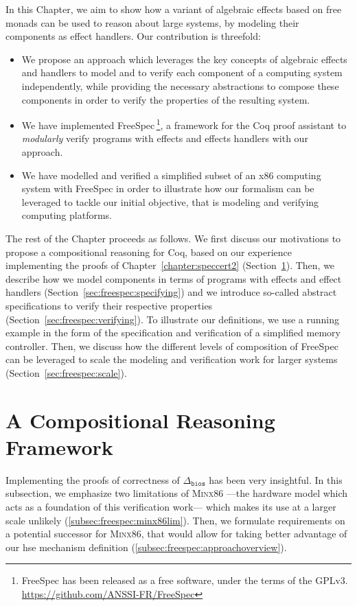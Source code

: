 In this Chapter, we aim to show how a variant of algebraic effects based on free
monads can be used to reason about large systems, by modeling their components
as effect handlers.
%
Our contribution is threefold:
\begin{itemize}
\item We propose an approach which leverages the key concepts of algebraic
  effects and handlers to model and to verify each component of a computing
  system independently, while providing the necessary abstractions to compose
  these components in order to verify the properties of the resulting system.
%
\item We have implemented FreeSpec\,\footnote{FreeSpec has been released as a
    free software, under the terms of the GPLv3.
    \url{https://github.com/ANSSI-FR/FreeSpec}}, a framework for the Coq proof
  assistant to \emph{modularly} verify programs with effects and effects
  handlers with our approach.
%
\item We have modelled and verified a simplified subset of an x86 computing
  system with FreeSpec in order to illustrate how our formalism can be leveraged
  to tackle our initial objective, that is modeling and verifying computing
  platforms.
\end{itemize}

The rest of the Chapter proceeds as follows.
%
We first discuss our motivations to propose a compositional reasoning for Coq,
based on our experience implementing the proofs of
Chapter~\ref{chapter:speccert2} (Section~\ref{sec:freespec:why}).
%
Then, we describe how we model components in terms of programs with effects and effect
handlers (Section~\ref{sec:freespec:specifying}) and we introduce so-called
abstract specifications to verify their respective properties
(Section~\ref{sec:freespec:verifying}).
%
To illustrate our definitions, we use a running example in the form of the
specification and verification of a simplified memory controller.
%
Then, we discuss how the different levels of composition of FreeSpec can be
leveraged to scale the modeling and verification work for larger systems
(Section~\ref{sec:freespec:scale}).

\section{A Compositional Reasoning Framework}
\label{sec:freespec:why}

Implementing the proofs of correctness of \( \Delta_{\mathtt{bios}} \) has been
very insightful.
%
In this subsection, we emphasize two limitations of {\scshape Minx86} ---the
hardware model which acts as a foundation of this verification work--- which
makes its use at a larger scale unlikely (\ref{subsec:freespec:minx86lim}).
%
Then, we formulate requirements on a potential successor for {\scshape Minx86},
that would allow for taking better advantage of our \ac{hse} mechanism
definition (\ref{subsec:freespec:approachoverview}).

